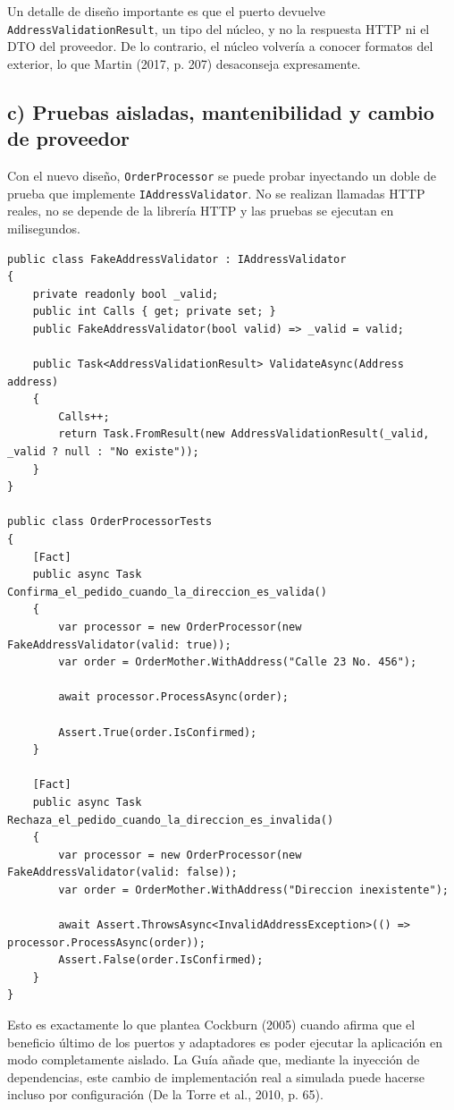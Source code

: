 \documentclass[11pt,a4paper]{article}
\begin{document}
Un detalle de diseño importante es que el puerto devuelve \texttt{AddressValidationResult}, un tipo del núcleo, y no la respuesta HTTP ni el DTO del proveedor. De lo contrario, el núcleo volvería a conocer formatos del exterior, lo que Martin (2017, p. 207) desaconseja expresamente.

\subsection{c) Pruebas aisladas, mantenibilidad y cambio de proveedor}

Con el nuevo diseño, \texttt{OrderProcessor} se puede probar inyectando un doble de prueba que implemente \texttt{IAddressValidator}. No se realizan llamadas HTTP reales, no se depende de la librería HTTP y las pruebas se ejecutan en milisegundos.

\begin{lstlisting}[caption={Prueba unitaria de OrderProcessor con un doble de prueba (xUnit).},label={lst:test}]
public class FakeAddressValidator : IAddressValidator
{
    private readonly bool _valid;
    public int Calls { get; private set; }
    public FakeAddressValidator(bool valid) => _valid = valid;

    public Task<AddressValidationResult> ValidateAsync(Address address)
    {
        Calls++;
        return Task.FromResult(new AddressValidationResult(_valid, _valid ? null : "No existe"));
    }
}

public class OrderProcessorTests
{
    [Fact]
    public async Task Confirma_el_pedido_cuando_la_direccion_es_valida()
    {
        var processor = new OrderProcessor(new FakeAddressValidator(valid: true));
        var order = OrderMother.WithAddress("Calle 23 No. 456");

        await processor.ProcessAsync(order);

        Assert.True(order.IsConfirmed);
    }

    [Fact]
    public async Task Rechaza_el_pedido_cuando_la_direccion_es_invalida()
    {
        var processor = new OrderProcessor(new FakeAddressValidator(valid: false));
        var order = OrderMother.WithAddress("Direccion inexistente");

        await Assert.ThrowsAsync<InvalidAddressException>(() => processor.ProcessAsync(order));
        Assert.False(order.IsConfirmed);
    }
}
\end{lstlisting}

Esto es exactamente lo que plantea Cockburn (2005) cuando afirma que el beneficio último de los puertos y adaptadores es poder ejecutar la aplicación en modo completamente aislado. La Guía añade que, mediante la inyección de dependencias, este cambio de implementación real a simulada puede hacerse incluso por configuración (De la Torre et al., 2010, p. 65).
\end{document}
